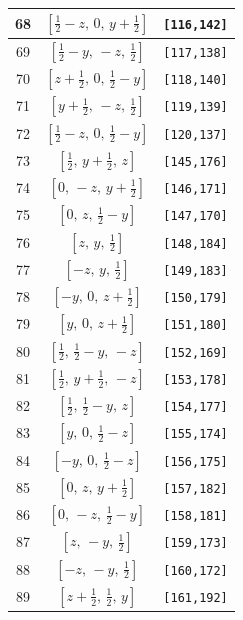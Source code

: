 \documentclass[fleqn,8pt]{jsarticle}
\begin{document}
\begin{longtable}{ccc}
68 & $\left[ \frac{1}{2} - z,\, 0,\, y + \frac{1}{2} \right]$ & {\tt [116,142]} \\ \hline
69 & $\left[ \frac{1}{2} - y,\, - z,\, \frac{1}{2} \right]$ & {\tt [117,138]} \\ \hline
70 & $\left[ z + \frac{1}{2},\, 0,\, \frac{1}{2} - y \right]$ & {\tt [118,140]} \\ \hline
71 & $\left[ y + \frac{1}{2},\, - z,\, \frac{1}{2} \right]$ & {\tt [119,139]} \\ \hline
72 & $\left[ \frac{1}{2} - z,\, 0,\, \frac{1}{2} - y \right]$ & {\tt [120,137]} \\ \hline
73 & $\left[ \frac{1}{2},\, y + \frac{1}{2},\, z \right]$ & {\tt [145,176]} \\ \hline
74 & $\left[ 0,\, - z,\, y + \frac{1}{2} \right]$ & {\tt [146,171]} \\ \hline
75 & $\left[ 0,\, z,\, \frac{1}{2} - y \right]$ & {\tt [147,170]} \\ \hline
76 & $\left[ z,\, y,\, \frac{1}{2} \right]$ & {\tt [148,184]} \\ \hline
77 & $\left[ - z,\, y,\, \frac{1}{2} \right]$ & {\tt [149,183]} \\ \hline
78 & $\left[ - y,\, 0,\, z + \frac{1}{2} \right]$ & {\tt [150,179]} \\ \hline
79 & $\left[ y,\, 0,\, z + \frac{1}{2} \right]$ & {\tt [151,180]} \\ \hline
80 & $\left[ \frac{1}{2},\, \frac{1}{2} - y,\, - z \right]$ & {\tt [152,169]} \\ \hline
81 & $\left[ \frac{1}{2},\, y + \frac{1}{2},\, - z \right]$ & {\tt [153,178]} \\ \hline
82 & $\left[ \frac{1}{2},\, \frac{1}{2} - y,\, z \right]$ & {\tt [154,177]} \\ \hline
83 & $\left[ y,\, 0,\, \frac{1}{2} - z \right]$ & {\tt [155,174]} \\ \hline
84 & $\left[ - y,\, 0,\, \frac{1}{2} - z \right]$ & {\tt [156,175]} \\ \hline
85 & $\left[ 0,\, z,\, y + \frac{1}{2} \right]$ & {\tt [157,182]} \\ \hline
86 & $\left[ 0,\, - z,\, \frac{1}{2} - y \right]$ & {\tt [158,181]} \\ \hline
87 & $\left[ z,\, - y,\, \frac{1}{2} \right]$ & {\tt [159,173]} \\ \hline
88 & $\left[ - z,\, - y,\, \frac{1}{2} \right]$ & {\tt [160,172]} \\ \hline
89 & $\left[ z + \frac{1}{2},\, \frac{1}{2},\, y \right]$ & {\tt [161,192]} \\ \hline

\end{longtable}
\end{document}
